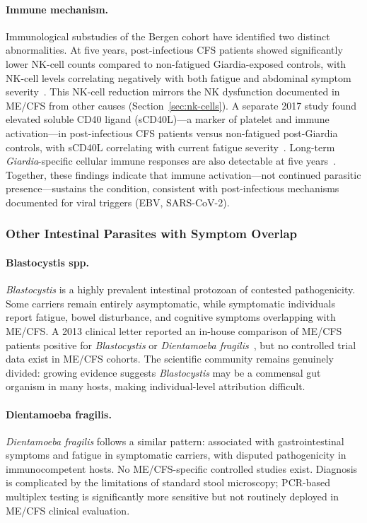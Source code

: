\paragraph{Immune mechanism.}
Immunological substudies of the Bergen cohort have identified two distinct abnormalities. At five years, post-infectious CFS patients showed significantly lower NK-cell counts compared to non-fatigued Giardia-exposed controls, with NK-cell levels correlating negatively with both fatigue and abdominal symptom severity~\cite{Hanevik2012immunophenotype}. This NK-cell reduction mirrors the NK dysfunction documented in ME/CFS from other causes (Section~\ref{sec:nk-cells}). A separate 2017 study found elevated soluble CD40 ligand (sCD40L)---a marker of platelet and immune activation---in post-infectious CFS patients versus non-fatigued post-Giardia controls, with sCD40L correlating with current fatigue severity~\cite{Hanevik2017cellular_immunity}. Long-term \emph{Giardia}-specific cellular immune responses are also detectable at five years~\cite{Bolstad2017giardia_immune}. Together, these findings indicate that immune activation---not continued parasitic presence---sustains the condition, consistent with post-infectious mechanisms documented for viral triggers (EBV, SARS-CoV-2).

\subsubsection{Other Intestinal Parasites with Symptom Overlap}

\paragraph{Blastocystis spp.}
\emph{Blastocystis} is a highly prevalent intestinal protozoan of contested pathogenicity. Some carriers remain entirely asymptomatic, while symptomatic individuals report fatigue, bowel disturbance, and cognitive symptoms overlapping with ME/CFS. A 2013 clinical letter reported an in-house comparison of ME/CFS patients positive for \emph{Blastocystis} or \emph{Dientamoeba fragilis}~\cite{Blastocystis2013letter}, but no controlled trial data exist in ME/CFS cohorts. The scientific community remains genuinely divided: growing evidence suggests \emph{Blastocystis} may be a commensal gut organism in many hosts, making individual-level attribution difficult.

\paragraph{Dientamoeba fragilis.}
\emph{Dientamoeba fragilis} follows a similar pattern: associated with gastrointestinal symptoms and fatigue in symptomatic carriers, with disputed pathogenicity in immunocompetent hosts. No ME/CFS-specific controlled studies exist. Diagnosis is complicated by the limitations of standard stool microscopy; PCR-based multiplex testing is significantly more sensitive but not routinely deployed in ME/CFS clinical evaluation.

